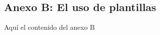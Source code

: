 \begin{appendices}
\chapter*{Anexo B: El uso de plantillas}

Aquí el contenido del anexo B



\end{appendices}